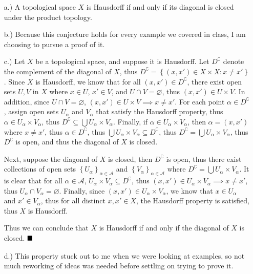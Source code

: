 \documentclass[12pt]{article}
\newcommand{\braces}[1]{\left\{#1\right\}}           %
\begin{document}
\begin{itemize}
    \item [a.)] A topological space $X$ is Hausdorff if and only if its diagonal is closed under the product topology.

    \item [b.)] Because this conjecture holds for every example we covered in class, I am choosing to pursue a proof of it.

    \item [c.)] Let $X$ be a topological space, and suppose it is Hausdorff. Let $D^\complement$ denote the complement of the diagonal of $X$, thus $D^\complement=\braces{(x,x')\in X\times X:x\ne x'}$. Since $X$ is Hausdorff, we know that for all $(x,x')\in D^\complement$, there exist open sets $U,V$ in $X$ where $x\in U$, $x'\in V$, and $U\cap V=\varnothing$, thus $(x,x')\in U\times V$. In addition, since $U\cap V=\varnothing$, $(x,x')\in U\times V\implies x\ne x'$. For each point $\alpha\in D^\complement$, assign open sets $U_\alpha$ and $V_\alpha$ that satisfy the Hausdorff property, thus $\alpha\in U_\alpha\times V_\alpha$, thus $D^\complement\subseteq\displaystyle\bigcup U_\alpha\times V_\alpha$. Finally, if $\alpha\in U_\alpha\times V_\alpha$, then $\alpha=(x,x')$ where $x\ne x'$, thus $\alpha\in D^\complement$, thus $\displaystyle\bigcup U_\alpha\times V_\alpha\subseteq D^\complement$, thus $D^\complement=\displaystyle\bigcup U_\alpha\times V_\alpha$, thus $D^\complement$ is open, and thus the diagonal of $X$ is closed.

    Next, suppose the diagonal of $X$ is closed, then $D^\complement$ is open, thus there exist collections of open sets $\braces{U_\alpha}_{\alpha\in\mathcal{A}}$ and $\braces{V_\alpha}_{\alpha\in\mathcal{A}}$ where $D^\complement=\displaystyle\bigcup U_\alpha\times V_\alpha$. It is clear that for all $\alpha\in\mathcal{A}$, $U_\alpha\times V_\alpha\subseteq D^\complement$, thus $(x,x')\in U_\alpha\times V_\alpha\implies x\ne x'$, thus $U_\alpha\cap V_\alpha=\varnothing$. Finally, since $(x,x')\in U_\alpha\times V_\alpha$, we know that $x\in U_\alpha$ and $x'\in V_\alpha$, thus for all distinct $x,x'\in X$, the Hausdorff property is satisfied, thus $X$ is Hausdorff.

    Thus we can conclude that $X$ is Hausdorff if and only if the diagonal of $X$ is closed. $\newline\strut\hfill\blacksquare$

    \item [d.)] This property stuck out to me when we were looking at examples, so not much reworking of ideas was needed before settling on trying to prove it.
\end{itemize}
\end{document}
